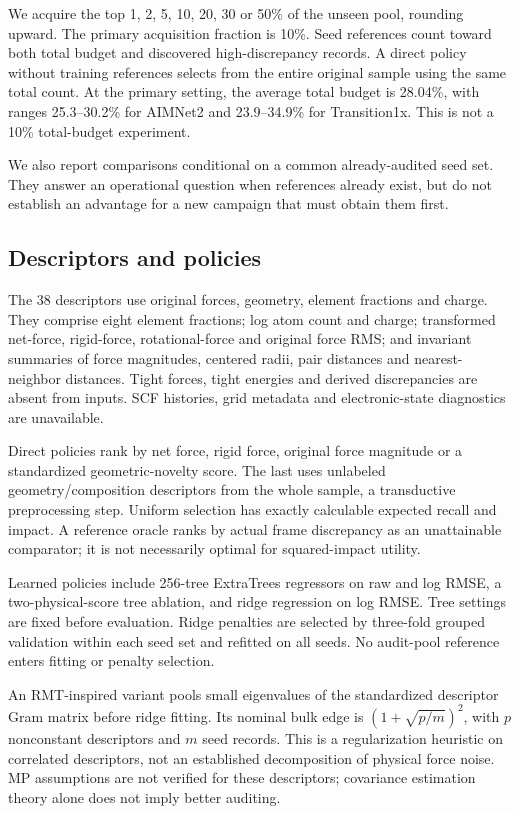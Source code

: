 \documentclass[11pt]{article}
\begin{document}
We acquire the top 1, 2, 5, 10, 20, 30 or 50\% of the unseen pool, rounding upward.
The primary acquisition fraction is 10\%. Seed references count toward both total
budget and discovered high-discrepancy records. A direct policy without training
references selects from the entire original sample using the same total count.
At the primary setting, the average total budget is 28.04\%, with ranges
25.3--30.2\% for AIMNet2 and 23.9--34.9\% for Transition1x. This is not a 10\%
total-budget experiment.

We also report comparisons conditional on a common already-audited seed set.
They answer an operational question when references already exist, but do not
establish an advantage for a new campaign that must obtain them first.

\subsection{Descriptors and policies}
The 38 descriptors use original forces, geometry, element fractions and charge.
They comprise eight element fractions; log atom count and charge; transformed
net-force, rigid-force, rotational-force and original force RMS; and invariant
summaries of force magnitudes, centered radii, pair distances and nearest-neighbor
distances. Tight forces, tight energies and derived discrepancies are absent from
inputs. SCF histories, grid metadata and electronic-state diagnostics are unavailable.

Direct policies rank by net force, rigid force, original force magnitude or a
standardized geometric-novelty score. The last uses unlabeled geometry/composition
descriptors from the whole sample, a transductive preprocessing step. Uniform
selection has exactly calculable expected recall and impact. A reference oracle
ranks by actual frame discrepancy as an unattainable comparator; it is not
necessarily optimal for squared-impact utility.

Learned policies include 256-tree ExtraTrees regressors \citep{geurts2006} on raw
and log RMSE, a two-physical-score tree ablation, and ridge regression on log RMSE.
Tree settings are fixed before evaluation. Ridge penalties are selected by
three-fold grouped validation within each seed set and refitted on all seeds.
No audit-pool reference enters fitting or penalty selection.

An RMT-inspired variant pools small eigenvalues of the standardized descriptor
Gram matrix before ridge fitting. Its nominal bulk edge is $(1+\sqrt{p/m})^2$,
with $p$ nonconstant descriptors and $m$ seed records. This is a regularization
heuristic on correlated descriptors, not an established decomposition of physical
force noise. MP assumptions are not verified for these descriptors; covariance
estimation theory \citep{marchenko1967,donoho2017} alone does not imply better auditing.
\end{document}
